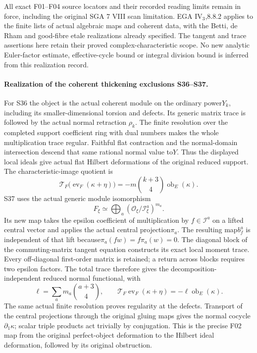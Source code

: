 All exact F01--F04 source locators and their
recorded reading limits remain in force,
including the original SGA 7 VIII scan limitation.
EGA IV$_3$,8.8.2 applies to the finite lists of
actual algebraic maps and coherent data, with
the Betti, de Rham and good-fibre etale
realizations already specified. The tangent
and trace assertions here retain their proved
complex-characteristic scope. No new analytic
Euler-factor estimate, effective-cycle bound
or integral division bound is inferred from
this realization record.


\paragraph{Realization of the coherent thickening exclusions S36--S37.}
For S36 the object is the actual coherent module on the ordinary
power$Y_k$, including its smaller-dimensional torsion and defects.
Its generic matrix trace is followed by the actual normal retraction
$\rho_k$. The finite resolution over the completed support coefficient
ring with dual numbers makes the whole multiplication trace regular.
Faithful flat contraction and the normal-domain intersection descend
that same rational normal value to$Y$. Thus the displayed local
ideals give actual flat Hilbert deformations of the original reduced
support. The characteristic-image quotient is
\[
 \mathcal T_F\bigl(\operatorname{ev}_F(\kappa+\eta)\bigr)
       =-m\binom{k+3}{4}\operatorname{ob}_E(\kappa).
\]
S37 uses the actual generic module isomorphism
\[
 F_\xi\simeq\bigoplus_a(\mathcal O_\xi/\mathcal I_\xi^a)^{m_a}.
\]
Its new map takes the epsilon coefficient of multiplication by
$f\in\mathcal I^a$ on a lifted central vector and applies the
actual central projection$\pi_a$. The resulting map$b_f^a$
is independent of that lift because$\pi_a(fw)=f\pi_a(w)=0$.
The diagonal block of the commuting-matrix tangent equation
constructs its exact local moment trace. Every off-diagonal
first-order matrix is retained; a return across blocks requires
two epsilon factors. The total trace therefore gives the
decomposition-independent reduced normal functional, with
\[
 \ell=\sum_a m_a\binom{a+3}{4},\qquad
 \mathcal T_F\operatorname{ev}_F(\kappa+\eta)
                       =-\ell\operatorname{ob}_E(\kappa).
\]
The same actual finite resolution proves regularity at the defects.
Transport of the central projections through the original gluing
maps gives the normal cocycle$\partial_1\kappa$; scalar triple
products act trivially by conjugation. This is the precise
F02 map from the original perfect-object deformation to the
Hilbert ideal deformation, followed by its original obstruction.

